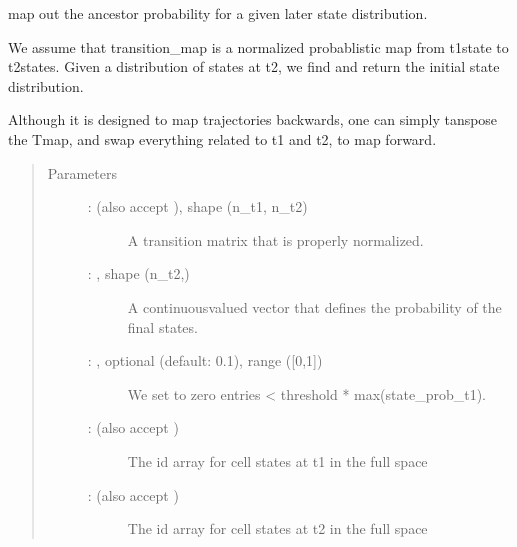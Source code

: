 \documentclass[letterpaper,10pt,english]{sphinxmanual}
\begin{document}
\begin{fulllineitems}
\label{\detokenize{cospar.hf.mapout_trajectories:cospar.hf.mapout_trajectories}}
map out the ancestor probability for a given later state distribution.

We assume that transition\_map is a normalized probablistic map from
t1\sphinxhyphen{}state to t2\sphinxhyphen{}states. Given a distribution of states at t2, we find
and return the initial state distribution.

Although it is designed to map trajectories backwards, one can simply
tanspose the Tmap, and swap everything related to t1 and t2, to map forward.
\begin{quote}\begin{description}
\item[{Parameters}] \leavevmode\begin{description}
\item[{ :  (also accept ), shape (n\_t1, n\_t2)}] \leavevmode
A transition matrix that is properly normalized.

\item[{ : , shape (n\_t2,)}] \leavevmode
A continuous\sphinxhyphen{}valued vector that defines the probability of the final states.

\item[{ : , optional (default: 0.1), range ({[}0,1{]})}] \leavevmode
We set to zero entries \textless{} threshold * max(state\_prob\_t1).

\item[{ :  (also accept )}] \leavevmode
The id array for cell states at t1 in the full space

\item[{ :  (also accept )}] \leavevmode
The id array for cell states at t2 in the full space


\end{description}
\end{description}
\end{quote}
\end{fulllineitems}
\end{document}
